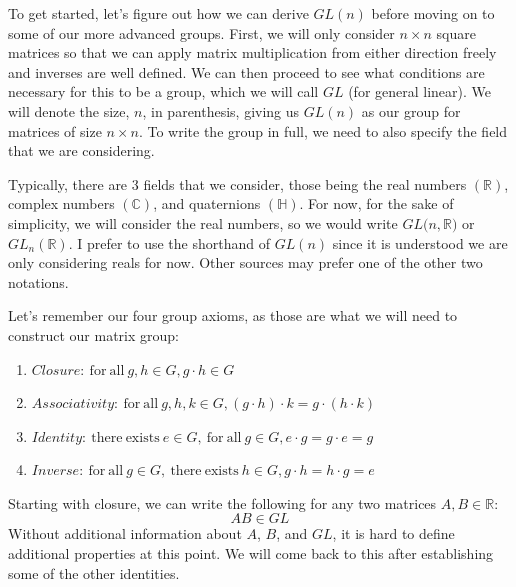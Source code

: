 To get started, let's figure out how we can derive $GL(n)$ before moving on to some of our more advanced groups. First, we will only consider $n\times n$ square matrices so that we can apply matrix multiplication from either direction freely and inverses are well defined. We can then proceed to see what conditions are necessary for this to be a group, which we will call $GL$ (for general linear). We will denote the size, $n$, in parenthesis, giving us $GL(n)$ as our group for matrices of size $n\times n$. To write the group in full, we need to also specify the field that we are considering. 

Typically, there are 3 fields that we consider, those being the real numbers $(\mathbb{R})$, complex numbers $(\mathbb{C})$, and quaternions $(\mathbb{H})$. For now, for the sake of simplicity, we will consider the real numbers, so we would write $GL(n,\mathbb{R)}$ or $GL_n(\mathbb{R})$. I prefer to use the shorthand of $GL(n)$ since it is understood we are only considering reals for now. Other sources may prefer one of the other two notations.

Let's remember our four group axioms, as those are what we will need to construct our matrix group:

\begin{enumerate}
\item $Closure{:} \mathrm{\ for \ all\ } g,h \in G, g\cdot h \in G$
\item $Associativity{:} \mathrm{\ for \ all \ } g,h,k \in  G, (g\cdot h)\cdot k=g\cdot(h\cdot k)$
\item $Identity{:} \mathrm{\ there \ exists  \ } e\in G, \mathrm{\ for \ all \ } g \in G, e\cdot g=g\cdot e=g$
\item $Inverse{:} \mathrm{\ for \ all \ } g \in G, \mathrm{\ there \ exists  \ } h \in G, g \cdot h=h\cdot g =e$
\end{enumerate}

Starting with closure, we can write the following for any two matrices $A,B\in\mathbb{R}$:
$$AB \in GL $$
Without additional information about $A$, $B$, and $GL$, it is hard to define additional properties at this point. We will come back to this after establishing some of the other identities.


